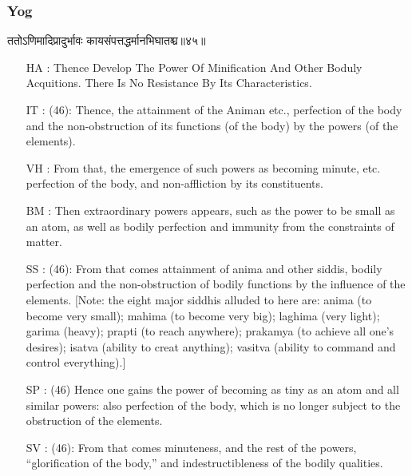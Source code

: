 \begin{frame}[fragile]\frametitle{Yog}
\begin{sanskrit}
ततोऽणिमादिप्रादुर्भावः कायसंपत्तद्धर्मानभिघातश्च॥४५॥
\end{sanskrit}
	\begin{itemize}
	\item [HA]: Thence Develop The Power Of Minification And Other Boduly Acquitions. There Is No Resistance By Its Characteristics.
	\item [IT]: (46): Thence, the attainment of the Animan etc., perfection of the body and the non-obstruction of its functions (of the body) by the powers (of the elements).
	\item [VH]: From that, the emergence of such powers as becoming minute, etc. perfection of the body, and non-affliction by its constituents.
	\item [BM]: Then extraordinary powers appears, such as the power to be small as an atom, as well as bodily perfection and immunity from the constraints of matter.
	\item [SS]: (46): From that comes attainment of anima and other siddis, bodily perfection and the non-obstruction of bodily functions by the influence of the elements. [Note: the eight major siddhis alluded to here are: anima (to become very small); mahima (to become very big); laghima (very light); garima (heavy); prapti (to reach anywhere); prakamya (to achieve all one’s desires); isatva (ability to creat anything); vasitva (ability to command and control everything).]
	\item [SP]: (46) Hence one gains the power of becoming as tiny as an atom and all similar powers: also perfection of the body, which is no longer subject to the obstruction of the elements.
	\item [SV]: (46): From that comes minuteness, and the rest of the powers, “glorification of the body,” and indestructibleness of the bodily qualities. 
	\end{itemize}
\end{frame}


